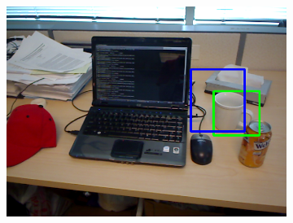 \begin{figure}
\begin{subfigure}[b]{0.3\textwidth}
		\includegraphics[width=\textwidth]{img/seguimiento_solo_frame/solo_frame-desk_1-coffee_mug_5-frame_28.png}
	\end{subfigure}
	

\end{figure}

